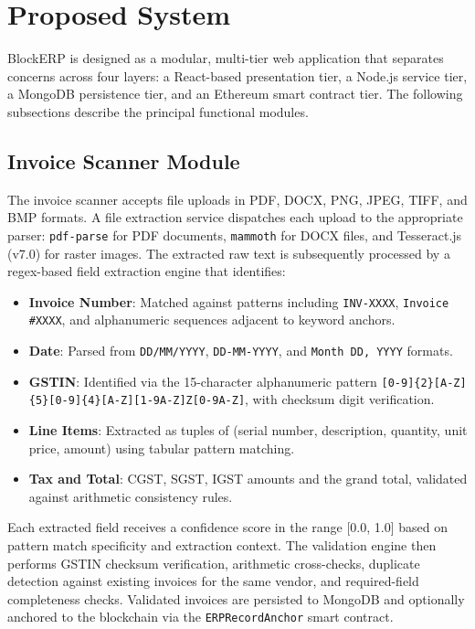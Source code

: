 \documentclass[conference]{IEEEtran}
\begin{document}
\section{Proposed System}

BlockERP is designed as a modular, multi-tier web application that separates concerns across four layers: a React-based presentation tier, a Node.js service tier, a MongoDB persistence tier, and an Ethereum smart contract tier. The following subsections describe the principal functional modules.

\subsection{Invoice Scanner Module}
The invoice scanner accepts file uploads in PDF, DOCX, PNG, JPEG, TIFF, and BMP formats. A file extraction service dispatches each upload to the appropriate parser: \texttt{pdf-parse} for PDF documents, \texttt{mammoth} for DOCX files, and Tesseract.js (v7.0) for raster images. The extracted raw text is subsequently processed by a regex-based field extraction engine that identifies:

\begin{itemize}
    \item \textbf{Invoice Number}: Matched against patterns including \texttt{INV-XXXX}, \texttt{Invoice \#XXXX}, and alphanumeric sequences adjacent to keyword anchors.
    \item \textbf{Date}: Parsed from \texttt{DD/MM/YYYY}, \texttt{DD-MM-YYYY}, and \texttt{Month DD, YYYY} formats.
    \item \textbf{GSTIN}: Identified via the 15-character alphanumeric pattern \texttt{[0-9]\{2\}[A-Z]\{5\}[0-9]\{4\}[A-Z][1-9A-Z]Z[0-9A-Z]}, with checksum digit verification.
    \item \textbf{Line Items}: Extracted as tuples of (serial number, description, quantity, unit price, amount) using tabular pattern matching.
    \item \textbf{Tax and Total}: CGST, SGST, IGST amounts and the grand total, validated against arithmetic consistency rules.
\end{itemize}

Each extracted field receives a confidence score in the range [0.0, 1.0] based on pattern match specificity and extraction context. The validation engine then performs GSTIN checksum verification, arithmetic cross-checks, duplicate detection against existing invoices for the same vendor, and required-field completeness checks. Validated invoices are persisted to MongoDB and optionally anchored to the blockchain via the \texttt{ERPRecordAnchor} smart contract.
\end{document}
